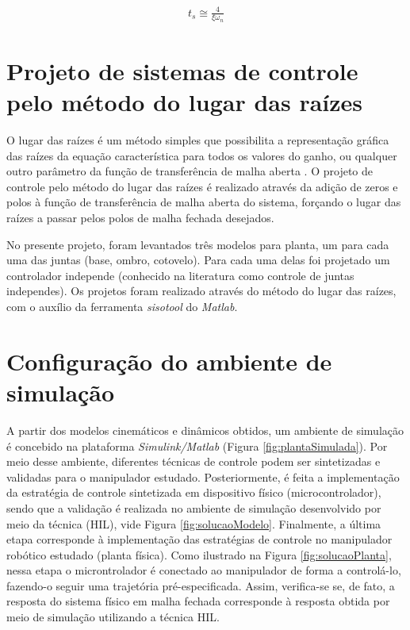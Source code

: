\begin{equation}
  \begin{gathered}
    t_s \cong \frac{4}{\xi \omega_n}
  \end{gathered}
  \label{eq:tempoAcomodacao}
\end{equation}

\section{Projeto de sistemas de controle pelo método do lugar das raízes}

O lugar das raízes é um método simples que possibilita a representação gráfica das raízes da equação
característica para todos os valores do ganho, ou qualquer outro parâmetro da função de transferência
de malha aberta \cite{Ogata}. O projeto de controle pelo método do lugar das raízes é realizado através 
da adição de zeros e polos à função de transferência de malha aberta do sistema, forçando o lugar das raízes a passar 
pelos polos de malha fechada desejados.

No presente projeto, foram levantados três modelos para planta, um para cada uma das juntas (base, ombro, cotovelo).
Para cada uma delas foi projetado um controlador independe (conhecido na literatura como controle de juntas independes). Os projetos 
foram realizado através do método do lugar das raízes, com o auxílio da ferramenta \textit{sisotool} do \textit{Matlab}.

\section{Configuração do ambiente de simulação}

A partir dos modelos cinemáticos e dinâmicos obtidos, um ambiente de simulação é 
concebido na plataforma \textit{Simulink/Matlab} (Figura \ref{fig:plantaSimulada}). Por meio desse 
ambiente, diferentes técnicas de controle podem ser sintetizadas e validadas para o manipulador estudado. 
Posteriormente, é feita a implementação da estratégia de controle sintetizada em dispositivo físico (microcontrolador),
sendo que a validação é realizada no ambiente de simulação 
desenvolvido por meio da técnica (HIL), vide Figura 
\ref{fig:solucaoModelo}. Finalmente, a última etapa corresponde à implementação das 
estratégias de controle no manipulador robótico estudado (planta física). Como ilustrado 
na Figura \ref{fig:solucaoPlanta}, nessa etapa o microntrolador é conectado ao manipulador de 
forma a controlá-lo, fazendo-o seguir uma trajetória pré-especificada. Assim, verifica-se 
se, de fato, a resposta do sistema físico em malha fechada corresponde à resposta obtida 
por meio de simulação utilizando a técnica HIL.

